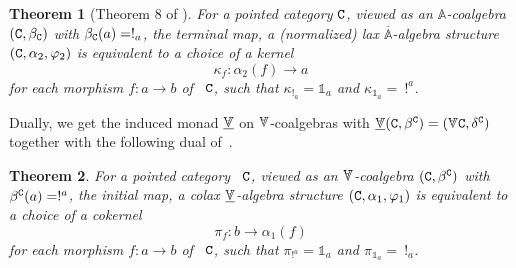 \documentclass[12pt,leqno]{amsart}
\newtheorem{theorem}{Theorem}%
\theoremstyle{definition}
\def\Ar{\mathbb{A}}
\def\id{{\mathbb 1}}
\newcommand{\C}{{\tt C}}
\newcommand{\eK}{\alpha_2}%
\newcommand{\eC}{\alpha_1}%
\newcommand{\4}{\texttt{4}}
\newcommand{\oAr}{\overline{\Ar}}
\newcommand{\Vr}{\text{\raisebox{\depth}{\scalebox{1}[-1]{$\Ar$}}}}
\newcommand{\uVr}{\underline{\text{\raisebox{\depth}{\scalebox{1}[-1]{$\Ar$}}}}}
\renewcommand{\phi}{\varphi}
\begin{document}
\begin{theorem}[Theorem 8 of \cite{pasticio}]
\label{theorem:pasticio_lax_are_kernels}
For a pointed category $\C$, viewed as an $\Ar$-coalgebra
$(\C,\beta_\C)$ with $\beta_\C(a)=!_a$, the terminal map, a
(normalized) lax $\oAr$-algebra structure $(\C,\eK,\phi_2)$ is
equivalent to a choice of a kernel
\[
\kappa_f\colon \eK (f)\to a
\]
for each morphism $f\colon a \to b$ of \ $\C$, such that
$\kappa_{!_a}=\id_a$ and $\kappa_{\id_a}=\ !^a$.
\end{theorem}

Dually, we get the induced monad $\uVr$ on
$\Vr$-coalgebras with $\uVr(\C,\beta^\C) = (\Vr\C,\delta^\C)$ together
with the
following dual of~\cite[Theorem~8]{pasticio}.

\begin{theorem}
For a pointed category \ $\C$, viewed as an $\Vr$-coalgebra
$(\C,\beta^\C)$ with $\beta^\C(a)=!^a$, the initial map, a colax
$\uVr$-algebra structure $(\C,\eC,\phi_1)$ is equivalent to a choice
of a cokernel
\[
\pi_f\colon b\to \eC (f)
\]
for each morphism $f: a \to b$ of \ $\C$, such that $\pi_{!^a}=\id_a$ and
$\pi_{\id_a}=\ !_a$. 
\end{theorem}
 
\end{document}
